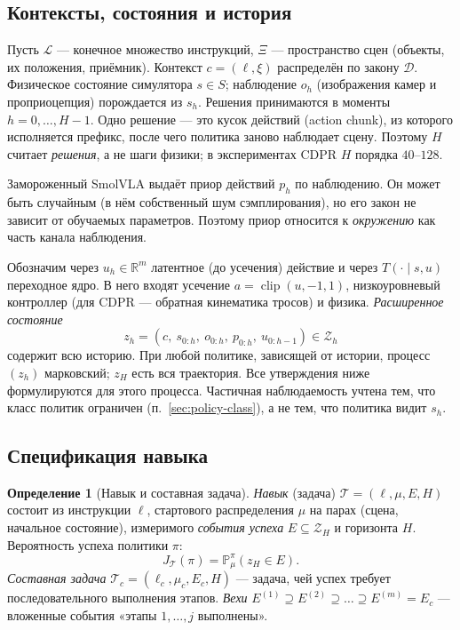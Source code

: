 \documentclass[11pt,a4paper]{article}
\theoremstyle{plain}
\theoremstyle{definition}
\newtheorem{definition}[theorem]{Определение}
\theoremstyle{remark}
\newcommand{\PP}{\mathbb{P}}
\newcommand{\R}{\mathbb{R}}
\DeclareMathOperator{\clip}{clip}
\newcommand{\cT}{\mathcal{T}}
\newcommand{\cZ}{\mathcal{Z}}
\newcommand{\cL}{\mathcal{L}}
\newcommand{\cD}{\mathcal{D}}
\begin{document}
\subsection{Контексты, состояния и история}
Пусть $\cL$ --- конечное множество инструкций, $\Xi$ --- пространство сцен (объекты, их положения, приёмник). Контекст $c=(\ell,\xi)$ распределён по закону $\cD$. Физическое состояние симулятора $s\in S$; наблюдение $o_h$ (изображения камер и проприоцепция) порождается из $s_h$. Решения принимаются в моменты $h=0,\dots,H-1$. Одно решение --- это кусок действий (action chunk), из которого исполняется префикс, после чего политика заново наблюдает сцену. Поэтому $H$ считает \emph{решения}, а не шаги физики; в экспериментах CDPR $H$ порядка $40$--$128$.

Замороженный SmolVLA выдаёт приор действий $p_h$ по наблюдению. Он может быть случайным (в нём собственный шум сэмплирования), но его закон не зависит от обучаемых параметров. Поэтому приор относится к \emph{окружению} как часть канала наблюдения.

Обозначим через $u_h\in\R^m$ латентное (до усечения) действие и через $T(\cdot\mid s,u)$ переходное ядро. В него входят усечение $a=\clip(u,-1,1)$, низкоуровневый контроллер (для CDPR --- обратная кинематика тросов) и физика. \emph{Расширенное состояние}
\[
z_h=(c,\ s_{0:h},\ o_{0:h},\ p_{0:h},\ u_{0:h-1})\in\cZ_h
\]
содержит всю историю. При любой политике, зависящей от истории, процесс $(z_h)$ марковский; $z_H$ есть вся траектория. Все утверждения ниже формулируются для этого процесса. Частичная наблюдаемость учтена тем, что класс политик ограничен (п.~\ref{sec:policy-class}), а не тем, что политика видит $s_h$.

\subsection{Спецификация навыка}
\begin{definition}[Навык и составная задача]\label{def:skill}
\emph{Навык} (задача) $\cT=(\ell,\mu,E,H)$ состоит из инструкции $\ell$, стартового распределения $\mu$ на парах (сцена, начальное состояние), измеримого \emph{события успеха} $E\subseteq\cZ_H$ и горизонта $H$. Вероятность успеха политики $\pi$:
\[
J_\cT(\pi)=\PP^\pi_\mu(z_H\in E).
\]
\emph{Составная задача} $\cT_c=(\ell_c,\mu_c,E_c,H)$ --- задача, чей успех требует последовательного выполнения этапов. \emph{Вехи} $E^{(1)}\supseteq E^{(2)}\supseteq\dots\supseteq E^{(m)}=E_c$ --- вложенные события «этапы $1,\dots,j$ выполнены».
\end{definition}
\end{document}
